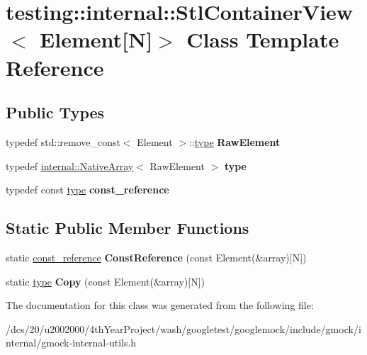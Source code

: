 \hypertarget{classtesting_1_1internal_1_1StlContainerView_3_01Element[N]_4}{}\section{testing\+:\+:internal\+:\+:Stl\+Container\+View$<$ Element\mbox{[}N\mbox{]}$>$ Class Template Reference}
\label{classtesting_1_1internal_1_1StlContainerView_3_01Element[N]_4}
\subsection*{Public Types}
\begin{DoxyCompactItemize}
\item 
\mbox{\label{classtesting_1_1internal_1_1StlContainerView_3_01Element[N]_4_a5675942dbaf84eee41e8e74f4c8864fb}} 
typedef std\+::remove\+\_\+const$<$ Element $>$\+::\mbox{\hyperlink{classtesting_1_1internal_1_1NativeArray}{type}} {\bfseries Raw\+Element}
\item 
\mbox{\label{classtesting_1_1internal_1_1StlContainerView_3_01Element[N]_4_a364efca99cc5a02829b4e3413c506b09}} 
typedef \mbox{\hyperlink{classtesting_1_1internal_1_1NativeArray}{internal\+::\+Native\+Array}}$<$ Raw\+Element $>$ {\bfseries type}
\item 
\mbox{\label{classtesting_1_1internal_1_1StlContainerView_3_01Element[N]_4_a481e6ab99316939484fad9c561af5e28}} 
typedef const \mbox{\hyperlink{classtesting_1_1internal_1_1NativeArray}{type}} {\bfseries const\+\_\+reference}
\end{DoxyCompactItemize}
\subsection*{Static Public Member Functions}
\begin{DoxyCompactItemize}
\item 
\mbox{\label{classtesting_1_1internal_1_1StlContainerView_3_01Element[N]_4_aa1b15d7f43d38751ae19f6dbdcb6aba3}} 
static \mbox{\hyperlink{classtesting_1_1internal_1_1NativeArray}{const\+\_\+reference}} {\bfseries Const\+Reference} (const Element(\&array)\mbox{[}N\mbox{]})
\item 
\mbox{\label{classtesting_1_1internal_1_1StlContainerView_3_01Element[N]_4_af2cf79fbd7f829229a47b52f863c68f8}} 
static \mbox{\hyperlink{classtesting_1_1internal_1_1NativeArray}{type}} {\bfseries Copy} (const Element(\&array)\mbox{[}N\mbox{]})
\end{DoxyCompactItemize}


The documentation for this class was generated from the following file\+:\begin{DoxyCompactItemize}
\item 
/dcs/20/u2002000/4th\+Year\+Project/wash/googletest/googlemock/include/gmock/internal/gmock-\/internal-\/utils.\+h\end{DoxyCompactItemize}
